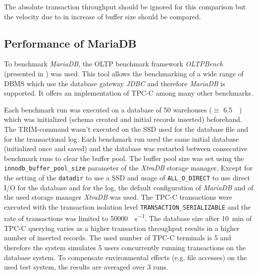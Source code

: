 	The absolute transaction throughput should be ignored for this comparison but the velocity due to in increase of buffer size should be compared.
	
\subsection{Performance of MariaDB}

	To benchmark \emph{MariaDB}, the OLTP benchmark framework \emph{OLTPBench} (presented in \cite{Difallah:2013}) was used. This tool allows the benchmarking of a wide range of DBMS which use the database gateway \emph{JDBC} and therefore \emph{MariaDB} is supported. It offers an implementation of TPC-C among many other benchmarks.
	
	Each benchmark run was executed on a database of 50 warehouses ($\equiv$ \SI{6.5}{\gibi\byte}) which was initialized (schema created and initial records inserted) beforehand. The TRIM-command wasn't executed on the SSD used for the database file and for the transactional log. Each benchmark run used the same initial database (initialized once and saved) and the database was restarted between consecutive benchmark runs to clear the buffer pool. The buffer pool size was set using the \lstinline{innodb_buffer_pool_size} parameter of the \emph{XtraDB} storage manager. Except for the setting of the \lstinline{datadir} to use a SSD and usage of \lstinline{ALL_O_DIRECT} to use direct I/O for the database and for the log, the default configuration of \emph{MariaDB} and of the used storage manager \emph{XtraDB} was used. The TPC-C transactions were executed with the transaction isolation level \lstinline{TRANSACTION_SERIALIZABLE} and the rate of transactions was limited to \SI{50000}{\transactions\per\second}. The database size after \SI{10}{\minute} of TPC-C querying varies as a higher transaction throughput results in a higher number of inserted records. The used number of TPC-C terminals is 5 and therefore the system simulates 5 users concurrently running transactions on the database system. To compensate environmental effects (e.g. file accesses) on the used test system, the results are averaged over 3 runs.
	
